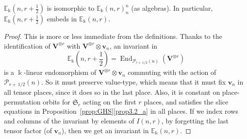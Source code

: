 \documentclass[ALCO,ThmDefs,Unicode,epreuves]{cedram}
\DeclareMathOperator{\End}{End}
\newcommand{\E}{\mathbb{E}}
\newcommand{\Sym}{\mathfrak{S}}
\newcommand{\Ptn}{\mathcal{P}}
\newcommand{\V}{\mathbf{V}} %
\newcommand{\bv}{\mathbf{v}} %
\newcommand{\fhalf}{\frac{1}{2}} %
\begin{document}
\begin{lemm}\label{lem:half-iso}
$\E_\Bbbk(n,r+\fhalf)$ is isomorphic to $\E_\Bbbk(n,r)^n_n$ (as
 algebras). In particular, $\E_\Bbbk(n,r+\fhalf)$ embeds in
 $\E_\Bbbk(n,r)$.
\end{lemm}

\begin{proof}
This is more or less immediate from the definitions. Thanks to the
identification of $\V^{\otimes r}$ with $\V^{\otimes r} \otimes
\bv_n$, an invariant in
\[
\E_\Bbbk\left(n,r+\fhalf\right) = \End_{\Ptn_{r+\,1/2}(n)}(\V^{\otimes r})
\]
is a $\Bbbk$-linear endomorphism of $\V^{\otimes r} \otimes \bv_n$
commuting with the action of $\Ptn_{r+\,1/2}(n)$. So it must preserve
value-type, which means that it must fix $\bv_n$ in all tensor places,
since it does so in the last place. Also, it is constant on
place-permutation orbits for $\Sym_r$ acting on the first $r$ places,
and satisfies the slice equations in Proposition~\ref{prop:GHS}\ref{prop3.2_a} in
all places. If we index rows and columns of the invariant by elements
of $I(n,r)$, by forgetting the last tensor factor (of $\bv_n$), then
we get an invariant in $\E_\Bbbk(n,r)$.
\end{proof}
\end{document}
